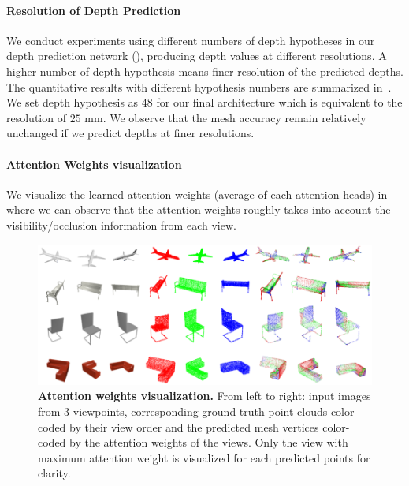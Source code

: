 \paragraph{Resolution of Depth Prediction}
We conduct experiments using different numbers of depth hypotheses in our depth prediction network (), producing depth values at different resolutions.
A higher number of depth hypothesis means finer resolution of the predicted depths.
The quantitative results with different hypothesis numbers are summarized in~. We set depth hypothesis as $48$ for our final architecture which is equivalent to the resolution of $25$ mm.
We observe that the mesh accuracy remain relatively unchanged if we predict depths at finer resolutions.


\paragraph{Attention Weights visualization}
We visualize the learned attention weights (average of each attention heads) in~ where we can observe that the attention weights roughly takes into account the visibility/occlusion information from each view.
\begin{figure}[t]
\begin{center}
\includegraphics[width=\linewidth]{imgs/attention_weights_visualization.png}
\end{center}
    \caption{
        \textbf{Attention weights visualization.}
        From left to right: input images from 3 viewpoints, corresponding ground truth point clouds color-coded by their view order and the predicted mesh vertices color-coded by the attention weights of the views.
        Only the view with maximum attention weight is visualized for each predicted points for clarity.
    }
\label{fig:attention_weights}
\end{figure}

